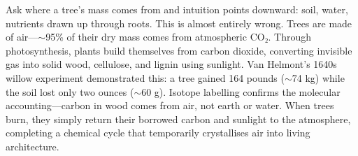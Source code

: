 Ask where a tree's mass comes from and intuition points downward: soil, water, nutrients drawn up through roots. This is almost entirely wrong. Trees are made of air—$\sim$95\% of their dry mass comes from atmospheric CO₂. Through photosynthesis, plants build themselves from carbon dioxide, converting invisible gas into solid wood, cellulose, and lignin using sunlight. Van Helmont's 1640s willow experiment demonstrated this: a tree gained 164 pounds ($\sim$74 kg) while the soil lost only two ounces ($\sim$60 g). Isotope labelling confirms the molecular accounting—carbon in wood comes from air, not earth or water. When trees burn, they simply return their borrowed carbon and sunlight to the atmosphere, completing a chemical cycle that temporarily crystallises air into living architecture.
